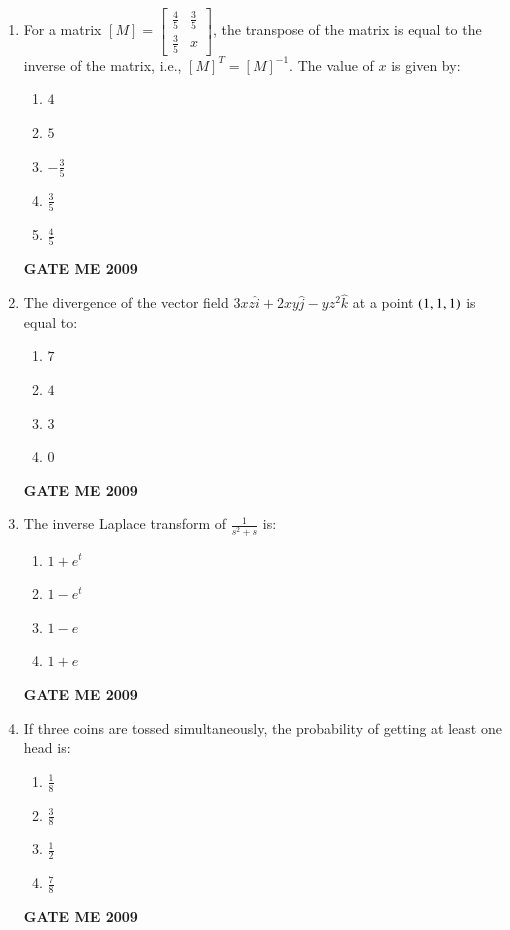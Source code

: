 \documentclass[journal]{IEEEtran}
\begin{document}
\begin{enumerate}[leftmargin=0pt]
    


        

\item For a matrix $[M]=\begin{bmatrix} \frac{4}{5} & \frac{3}{5} \\ \frac{3}{5} & x \end{bmatrix}$, the transpose of the matrix is equal to the inverse of the matrix, i.e., $[M]^T=[M]^{-1}$. The value of $x$ is given by:
  \begin{enumerate}[label=(\alph*)]
    \item $4$
    \item $5$
    \item $-\frac{3}{5}$
    \item $\frac{3}{5}$
    \item $\frac{4}{5}$
  \end{enumerate}
  \hfill{\textbf{GATE ME 2009}}


\item The divergence of the vector field $3 x z \hat{i} + 2 x y \hat{j} - y z^{2} \hat{k}$ at a point $\left(1,1,1\right)$ is equal to:
  \begin{enumerate}[label=(\alph*)]
    \item $7$
    \item $4$
    \item $3$
    \item $0$
  \end{enumerate}
  \hfill{\textbf{GATE ME 2009}}

\item The inverse Laplace transform of $\frac{1}{s^{2} + s}$ is:
  \begin{enumerate}[label=(\alph*)]
    \item $1 + e^{t}$
    \item $1 - e^{t}$
    \item $1 - e$
    \item $1 + e$
  \end{enumerate}
  \hfill{\textbf{GATE ME 2009}}

\item If three coins are tossed simultaneously, the probability of getting at least one head is:
  \begin{enumerate}[label=(\alph*)]
    \item $\frac{1}{8}$
    \item $\frac{3}{8}$
    \item $\frac{1}{2}$
    \item $\frac{7}{8}$
  \end{enumerate}
  \hfill{\textbf{GATE ME 2009}}



\end{enumerate}
\end{document}
